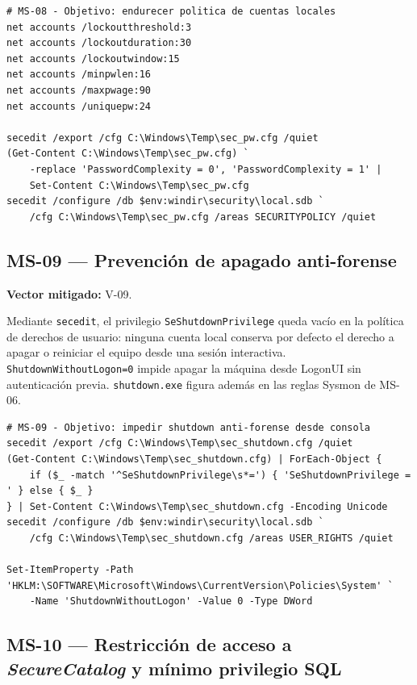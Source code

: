 \begin{lstlisting}[caption={MS-08 --- Objetivo: lockout estricto y complejidad de contraseñas.}]
# MS-08 - Objetivo: endurecer politica de cuentas locales
net accounts /lockoutthreshold:3
net accounts /lockoutduration:30
net accounts /lockoutwindow:15
net accounts /minpwlen:16
net accounts /maxpwage:90
net accounts /uniquepw:24

secedit /export /cfg C:\Windows\Temp\sec_pw.cfg /quiet
(Get-Content C:\Windows\Temp\sec_pw.cfg) `
    -replace 'PasswordComplexity = 0', 'PasswordComplexity = 1' |
    Set-Content C:\Windows\Temp\sec_pw.cfg
secedit /configure /db $env:windir\security\local.sdb `
    /cfg C:\Windows\Temp\sec_pw.cfg /areas SECURITYPOLICY /quiet
\end{lstlisting}

\subsection{MS-09 --- Prevención de apagado anti-forense}

\textbf{Vector mitigado:} V-09.

Mediante \texttt{secedit}, el privilegio \texttt{SeShutdown}\allowbreak\texttt{Privilege} queda vacío en la política de derechos de usuario: ninguna cuenta local conserva por defecto el derecho a apagar o reiniciar el equipo desde una sesión interactiva. \texttt{Shutdown}\allowbreak\texttt{WithoutLogon=0} impide apagar la máquina desde LogonUI sin autenticación previa. \texttt{shutdown.exe} figura además en las reglas Sysmon de MS-06.

\begin{lstlisting}[caption={MS-09 --- Objetivo: restringir apagado del sistema.}]
# MS-09 - Objetivo: impedir shutdown anti-forense desde consola
secedit /export /cfg C:\Windows\Temp\sec_shutdown.cfg /quiet
(Get-Content C:\Windows\Temp\sec_shutdown.cfg) | ForEach-Object {
    if ($_ -match '^SeShutdownPrivilege\s*=') { 'SeShutdownPrivilege = ' } else { $_ }
} | Set-Content C:\Windows\Temp\sec_shutdown.cfg -Encoding Unicode
secedit /configure /db $env:windir\security\local.sdb `
    /cfg C:\Windows\Temp\sec_shutdown.cfg /areas USER_RIGHTS /quiet

Set-ItemProperty -Path 'HKLM:\SOFTWARE\Microsoft\Windows\CurrentVersion\Policies\System' `
    -Name 'ShutdownWithoutLogon' -Value 0 -Type DWord
\end{lstlisting}

\subsection{MS-10 --- Restricción de acceso a \textit{SecureCatalog} y mínimo privilegio SQL}

